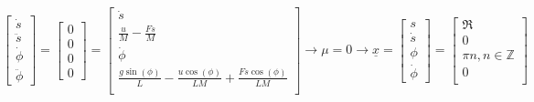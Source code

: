 \begin{equation}\label{ueqzero}
\begin{bmatrix}
    \dot s \\ \ddot s \\ \dot \phi \\ \ddot \phi
\end{bmatrix} =  \begin{bmatrix}
    0 \\ 0 \\ 0 \\ 0
\end{bmatrix} = \begin{bmatrix}
    \dot{s} \\
    \frac{u}{M}-\frac{F\dot{s}}{M}  \\
    \dot{\phi} \\
     \frac{g\sin\left(\phi \right)}{L}-\frac{u\cos\left(\phi \right)}{LM}+\frac{F\dot{s}\cos\left(\phi \right)}{LM} \\
\end{bmatrix} \rightarrow \mu=0 \rightarrow \underline{x} = \begin{bmatrix}
    s \\ \dot s \\ \phi \\ \dot \phi
\end{bmatrix} = \begin{bmatrix}
    \Re \\
    0 \\
    \pi n, n \in \mathbb{Z} \\
    0 \\
\end{bmatrix}
\end{equation}

